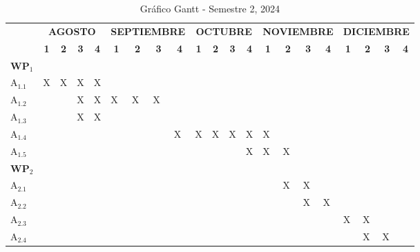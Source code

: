 \begin{table}[!ht]
\begin{center}
\begin{scriptsize}
\caption{Gráfico Gantt - Semestre 2, 2024}\label{tbl:wp}
\vspace{5pt}
\begin{tabular}{|p{.42cm}|p{.6cm}|p{.6cm}|p{.6cm}|p{.6cm}|p{.6cm}|p{.6cm}|p{.6cm}|p{.6cm}|p{.6cm}|p{.6cm}|p{.6cm}|p{.6cm}|p{.6cm}|p{.6cm}|p{.6cm}|p{.6cm}|p{.6cm}|p{.6cm}|p{.6cm}|p{.6cm}|}
\hline
\rowcolor{gray!20}
\multicolumn{1}{|c|}{}
& \multicolumn{4}{c|}{\textbf{AGOSTO}}
& \multicolumn{4}{c|}{\textbf{SEPTIEMBRE}}
& \multicolumn{4}{c|}{\textbf{OCTUBRE}}
& \multicolumn{4}{c|}{\textbf{NOVIEMBRE}}
& \multicolumn{4}{c|}{\textbf{DICIEMBRE}} \\ \cline{2-21}
\rowcolor{gray!20}
\multicolumn{1}{|c|}{\multirow{-2}{*}{\textbf{Act.}}} &
\multicolumn{1}{c|}{\textbf{1}} &
\multicolumn{1}{c|}{\textbf{2}} &
\multicolumn{1}{c|}{\textbf{3}} &
\multicolumn{1}{c|}{\textbf{4}} &
\multicolumn{1}{c|}{\textbf{1}} &
\multicolumn{1}{c|}{\textbf{2}} &
\multicolumn{1}{c|}{\textbf{3}} &
\multicolumn{1}{c|}{\textbf{4}} &
\multicolumn{1}{c|}{\textbf{1}} &
\multicolumn{1}{c|}{\textbf{2}} &
\multicolumn{1}{c|}{\textbf{3}} &
\multicolumn{1}{c|}{\textbf{4}} &
\multicolumn{1}{c|}{\textbf{1}} &
\multicolumn{1}{c|}{\textbf{2}} &
\multicolumn{1}{c|}{\textbf{3}} &
\multicolumn{1}{c|}{\textbf{4}} &
\multicolumn{1}{c|}{\textbf{1}} &
\multicolumn{1}{c|}{\textbf{2}} &
\multicolumn{1}{c|}{\textbf{3}} &
\multicolumn{1}{c|}{\textbf{4}} \\ \hline
\multicolumn{1}{c}{\textbf{WP}$_{1}$} \\ \hline
A$_{1.1}$ &X&X&X&X& & & & & & & & & & & & & & & & \\ \hline
A$_{1.2}$ & & &X&X&X&X&X& & & & & & & & & & & & & \\ \hline
A$_{1.3}$ & & &X&X& & & & & & & & & & & & & & & & \\ \hline
A$_{1.4}$ & & & & & & & &X&X&X&X&X&X& & & & & & & \\ \hline
A$_{1.5}$ & & & & & & & & & & & &X&X&X& & & & & & \\ \hline
\multicolumn{1}{c}{\textbf{WP}$_{2}$} \\ \hline
A$_{2.1}$ & & & & & & & & & & & & & &X&X& & & & & \\ \hline
A$_{2.2}$ & & & & & & & & & & & & & & &X&X& & & & \\ \hline
A$_{2.3}$ & & & & & & & & & & & & & & & & &X&X& & \\ \hline
A$_{2.4}$ & & & & & & & & & & & & & & & & & &X&X&  \\ \hline
\end{tabular}
\end{scriptsize}
\end{center}
\end{table}




